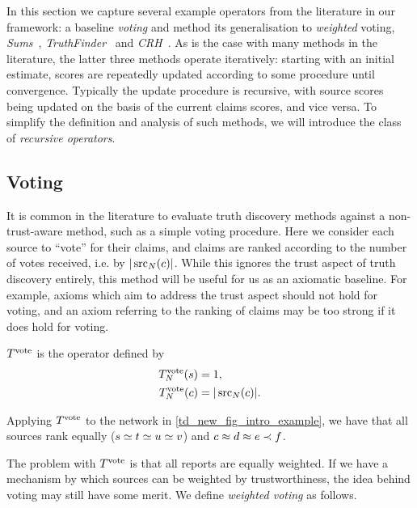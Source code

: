 In this section we capture several example operators from the literature in our
framework: a baseline \emph{voting} and method its generalisation to
\emph{weighted} voting, \emph{Sums}~\cite{pasternack2010},
\emph{TruthFinder}~\cite{yin2008} and \emph{CRH}~\cite{li2016}. As is the case
with many methods in the literature, the latter three methods operate
iteratively: starting with an initial estimate, scores are repeatedly updated
according to some procedure until convergence. Typically the update procedure
is recursive, with source scores being updated on the basis of the current
claims scores, and vice versa.  To simplify the definition and analysis of such
methods, we will introduce the class of \emph{recursive operators}.

\subsection{Voting}

It is common in the literature to evaluate truth discovery methods against a
non-trust-aware method, such as a simple voting procedure.\footnotemark{} Here
we consider each source to ``vote'' for their claims, and claims are ranked
according to the number of votes received, i.e. by $|\operatorname{src}_N(c)|$. While this
ignores the trust aspect of truth discovery entirely, this method will be
useful for us as an axiomatic baseline. For example, axioms which aim to
address the trust aspect should not hold for voting, and an axiom referring to
the ranking of claims may be too strong if it does hold for voting.


\begin{definition}
    $T^{\operatorname{vote}}$ is the operator defined by
    \begin{align*}
        T^{\operatorname{vote}}_N(s) &= 1,\\
        T^{\operatorname{vote}}_N(c) &= |\operatorname{src}_N(c)|.
    \end{align*}
\end{definition}

Applying $T^{\operatorname{vote}}{}$ to the network in \cref{td_new_fig_intro_example}, we have
that all sources rank equally ($s \simeq t \simeq u \simeq v$) and $c \approx d \approx e
\prec f$.

The problem with $T^{\operatorname{vote}}{}$ is that all reports are equally weighted. If we
have a mechanism by which sources can be weighted by trustworthiness, the idea
behind voting may still have some merit. We define \emph{weighted voting} as
follows.

